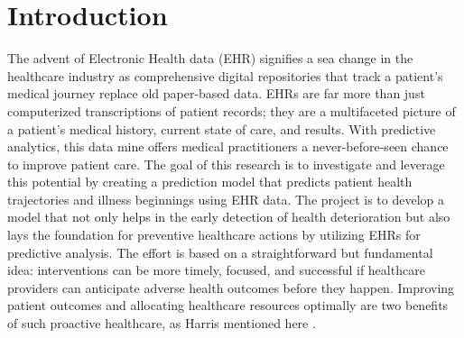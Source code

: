 \documentclass[manuscript,screen,]{acmart}
\begin{document}
\maketitle

\newpage
\section{Introduction}
The advent of Electronic Health data (EHR) signifies a sea change in the healthcare industry as comprehensive digital repositories that track a patient's medical journey replace old paper-based data. EHRs are far more than just computerized transcriptions of patient records; they are a multifaceted picture of a patient's medical history, current state of care, and results. With predictive analytics, this data mine offers medical practitioners a never-before-seen chance to improve patient care. The goal of this research is to investigate and leverage this potential by creating a prediction model that predicts patient health trajectories and illness beginnings using EHR data.
The project is to develop a model that not only helps in the early detection of health deterioration but also lays the foundation for preventive healthcare actions by utilizing EHRs for predictive analysis. The effort is based on a straightforward but fundamental idea: interventions can be more timely, focused, and successful if healthcare providers can anticipate adverse health outcomes before they happen. Improving patient outcomes and allocating healthcare resources optimally are two benefits of such proactive healthcare, as Harris mentioned here \cite{harris2017sustainability}.
\end{document}
